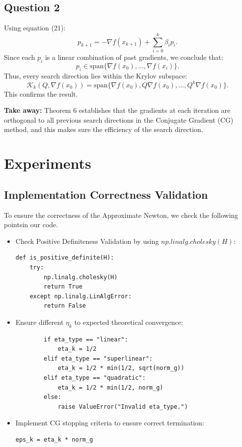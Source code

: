 \documentclass[12pt]{article}
\begin{document}
\subsection{Question 2}

Using equation (21):
\[
p_{k+1} = -\nabla f(x_{k+1}) + \sum_{i=0}^{k} \beta_i p_i.
\]
Since each $p_i$ is a linear combination of past gradients, we conclude that:
\[
p_i \in \text{span}\{ \nabla f(x_0), \dots, \nabla f(x_i) \}.
\]
Thus, every search direction lies within the Krylov subspace:
\[
\mathcal{K}_k(Q, \nabla f(x_0)) = \text{span}\{ \nabla f(x_0), Q \nabla f(x_0), \dots, Q^k \nabla f(x_0) \}.
\]
This confirms the result.

\textbf{Take away:} Theorem 6 establishes that the gradients at each iteration are orthogonal to all previous search directions in the Conjugate Gradient (CG) method, and this makes sure the efficiency of the search direction.


\section{Experiments}

\subsection{Implementation Correctness Validation}

To ensure the correctness of the Approximate Newton, we check the following pointsin our code.

\begin{itemize}
    \item Check Positive Definiteness Validation by using $np.linalg.cholesky(H)$:
\begin{lstlisting}
def is_positive_definite(H):
    try:
        np.linalg.cholesky(H)
        return True
    except np.linalg.LinAlgError:
        return False
\end{lstlisting}
    \item Ensure different $\eta_k$ to expected theoretical convergence:
\begin{lstlisting}
        if eta_type == "linear":
            eta_k = 1/2 
        elif eta_type == "superlinear":
            eta_k = 1/2 * min(1/2, sqrt(norm_g))
        elif eta_type == "quadratic":
            eta_k = 1/2 * min(1/2, norm_g)
        else:
            raise ValueError("Invalid eta_type.")
\end{lstlisting}
    \item Implement CG stopping criteria to ensure correct termination:
\begin{lstlisting}
eps_k = eta_k * norm_g
\end{lstlisting}
\end{itemize}
\end{document}
